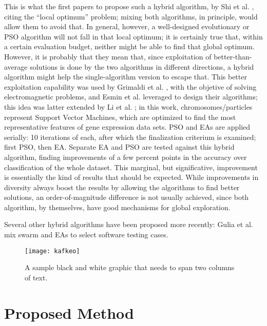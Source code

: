 This is what the first papers to propose such a hybrid algorithm, by
Shi et al. \cite{shi2003hybrid}, citing the ``local optimum'' problem;
mixing both algorithms, in principle, would allow them to avoid
that. In general, however, a well-designed evolutionary or PSO
algorithm will not fall in that local optimum; it is certainly true
that, within a certain evaluation budget, neither might be able to
find that global optimum. However, it is probably that they mean that,
since exploitation of better-than-average solutions is done by the two
algorithms in different directions, a hybrid algorithm might help the
single-algorithm version to escape that.
This better exploitation capability was used by Grimaldi et al. \cite{grimaldi2005genetical}, %
with the objetive of solving electromagnetic problems,
and Esmin et al. \cite{esmin2006hybrid} leveraged to design their
algorithms; this idea was
latter extended by Li et al. \cite{li2008gene}; in this work,
chromosomes/particles represent Support Vector Machines, which are
optimized to find the most representative features of gene expression
data sets. PSO and EAs are applied serially: 10 iterations of each,
after which the finalization criterium is examined; first PSO, then
EA. Separate EA and PSO are tested against this hybrid algorithm,
finding improvements of a few percent points in the accuracy over
classification of the whole dataset. This marginal, but significative,
improvement is essentially the kind of results that should be
expected. While improvements in diversity always boost the results by
allowing the algorithms to find better solutions, an
order-of-magnitude difference is not usually  achieved, since both
algorithm, by themselves, have good mechanisms for global
exploration.

Several other hybrid algorithms have been proposed more recently:
Gulia et al. \cite{gulia2019hybrid} mix swarm and EAs to select
software testing cases. %


\begin{figure*}
\texttt{[image: kafkeo]}
\caption{A sample black and white graphic
that needs to span two columns of text.}
\label{fig:kafkeo}
\end{figure*}

\section{Proposed Method}
\label{method}

